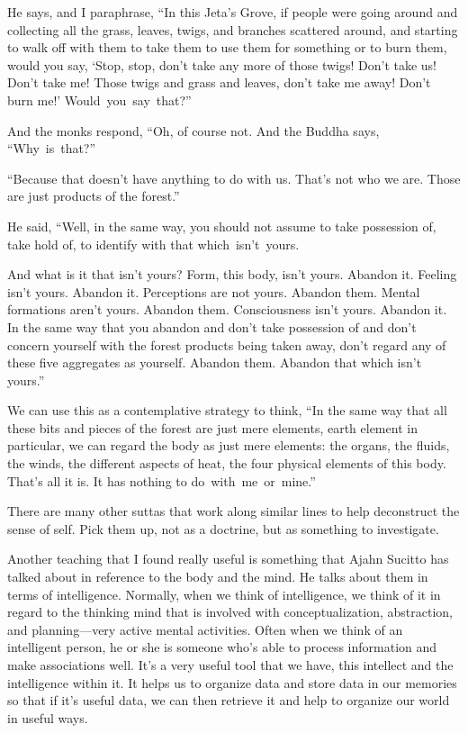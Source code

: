 He says, and I paraphrase, ``In this Jeta's Grove, if people were going around and collecting all the grass, leaves, twigs, and branches scattered around, and starting to walk off with them to take them to use them for something or to burn them, would you say, `Stop, stop, don't take any more of those twigs! Don't take us! Don't take me! Those twigs and grass and leaves, don't take me away! Don't burn me!' \mbox{Would you say that?''}


And the monks respond, ``Oh, of course not. And the Buddha says, \mbox{``Why is that?''}

``Because that doesn't have anything to do with us. That's not who we are. Those are just products of the forest.''

He said, ``Well, in the same way, you should not assume to take possession of, take hold of, to identify with that \mbox{which isn't yours.}

And what is it that isn't yours? Form, this body, isn't yours. Abandon it. Feeling isn't yours. Abandon it. Perceptions are not yours. Abandon them. Mental formations aren't yours. Abandon them. Consciousness isn't yours. Abandon it. In the same way that you abandon and don't take possession of and don't concern yourself with the forest products being taken away, don't regard any of these five aggregates as yourself. Abandon them. Abandon that which isn't yours.''

We can use this as a contemplative strategy to think, ``In the same way that all these bits and pieces of the forest are just mere elements, earth element in particular, we can regard the body as just mere elements: the organs, the fluids, the winds, the different aspects of heat, the four physical elements of this body. That's all it is. It has nothing to \mbox{do with me or mine.''}

There are many other suttas that work along similar lines to help deconstruct the sense of self. Pick them up, not as a doctrine, but as something to investigate.

Another teaching that I found really useful is something that Ajahn Sucitto has talked about in reference to the body and the mind. He talks about them in terms of intelligence. Normally, when we think of intelligence, we think of it in regard to the thinking mind that is involved with conceptualization, abstraction, and planning---very active mental activities. Often when we think of an intelligent person, he or she is someone who's able to process information and make associations well. It's a very useful tool that we have, this intellect and the intelligence within it. It helps us to organize data and store data in our memories so that if it's useful data, we can then retrieve it and help to organize our world in useful ways.

